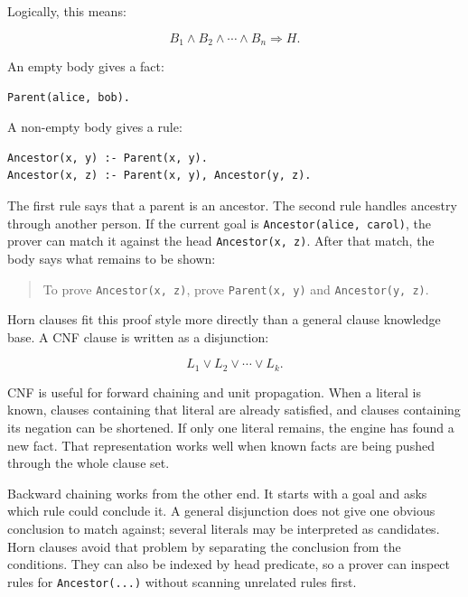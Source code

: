 Logically, this means:

\begin{equation}
  B_1 \land B_2 \land \cdots \land B_n \Rightarrow H.
\end{equation}

An empty body gives a fact:

\begin{verbatim}
Parent(alice, bob).
\end{verbatim}

A non-empty body gives a rule:

\begin{verbatim}
Ancestor(x, y) :- Parent(x, y).
Ancestor(x, z) :- Parent(x, y), Ancestor(y, z).
\end{verbatim}

The first rule says that a parent is an ancestor.
The second rule handles ancestry through another person.
If the current goal is \texttt{Ancestor(alice, carol)}, the prover can match it
against the head \texttt{Ancestor(x, z)}.
After that match, the body says what remains to be shown:

\begin{quote}
To prove \texttt{Ancestor(x, z)}, prove \texttt{Parent(x, y)} and
\texttt{Ancestor(y, z)}.
\end{quote}

Horn clauses fit this proof style more directly than a general clause
knowledge base.
A CNF clause is written as a disjunction:

\begin{equation}
  L_1 \lor L_2 \lor \cdots \lor L_k.
\end{equation}

CNF is useful for forward chaining and unit propagation.
When a literal is known, clauses containing that literal are already satisfied,
and clauses containing its negation can be shortened.
If only one literal remains, the engine has found a new fact.
That representation works well when known facts are being pushed through the
whole clause set.

Backward chaining works from the other end.
It starts with a goal and asks which rule could conclude it.
A general disjunction does not give one obvious conclusion to match against;
several literals may be interpreted as candidates.
Horn clauses avoid that problem by separating the conclusion from the
conditions.
They can also be indexed by head predicate, so a prover can inspect rules for
\texttt{Ancestor(...)} without scanning unrelated rules first.

